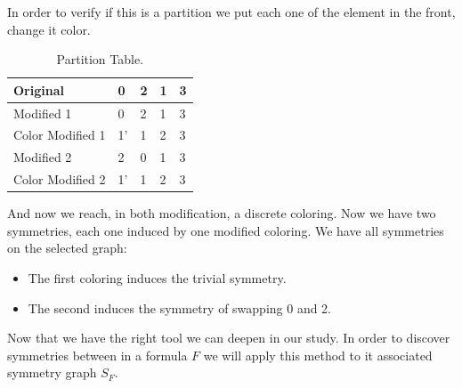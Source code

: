 {\begin{example}
In order to verify if this is a partition we put each one of the element in the front, change it color.

\begin{table}[h]
  \begin{center}
    \begin{tabular}{|l|l|l|l|l|}
      \hline
      Original & 0 & 2 & 1 & 3 \\
      \hline
      Modified 1 & 0 & 2 & 1 & 3 \\
      \hline
      Color Modified 1& 1'  & 1 & 2 & 3 \\
      \hline
      Modified 2 & 2 & 0 & 1 & 3 \\
      \hline
      Color Modified 2& 1'  & 1 & 2 & 3 \\
      \hline
    \end{tabular}
  \end{center}
  \caption{Partition Table.}
\end{table}

And now we reach, in both modification, a discrete coloring. Now we have two symmetries, each one induced by one modified coloring. We have all symmetries on the selected graph:
\begin{itemize}
\item The first coloring induces the trivial symmetry.
\item The second induces the symmetry of swapping 0 and 2.
\end{itemize}

\end{example}

Now that we have the right tool we can deepen in our study. In order to discover symmetries between in a formula $F$  we will apply this method to it associated symmetry graph $S_F$.

}
